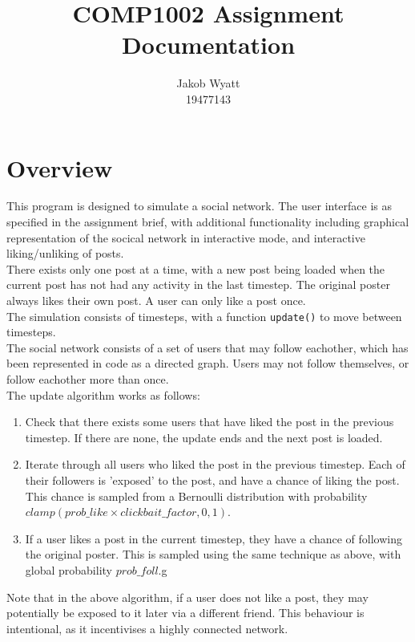 \documentclass{article}
\title{COMP1002 Assignment\\Documentation}
\author{Jakob Wyatt\\19477143}
\begin{document}
\maketitle
\pagebreak
\section{Overview}
\label{sec:Overview}
This program is designed to simulate a social network.
The user interface is as specified in the assignment brief,
with additional functionality including graphical representation
of the socical network in interactive mode, and interactive liking/unliking 
of posts.\\
There exists only one post at a time, with a new post being loaded when the current
post has not had any activity in the last timestep. The original poster always
likes their own post. A user can only like a post once.\\
The simulation consists
of timesteps, with a function \texttt{update()} to move between timesteps.\\
The social network consists of a set of users that may follow eachother,
which has been represented in code as a directed graph. Users may not follow themselves,
or follow eachother more than once.\\
The update algorithm works as follows:
\begin{enumerate}
    \item Check that there exists some users that have liked the post in the previous timestep.
            If there are none, the update ends and the next post is loaded.
    \item Iterate through all users who liked the post in the previous timestep.
            Each of their followers is 'exposed' to the post, and have a chance of liking the post.
            This chance is sampled from a Bernoulli distribution with probability
            $\mathit{clamp}(\mathit{prob\_like} \times \mathit{clickbait\_factor}, 0, 1)$.
    \item If a user likes a post in the current timestep, they have a chance of following the
            original poster. This is sampled using the same technique as above, with global probability
            $\mathit{prob\_foll}$.g
\end{enumerate}
Note that in the above algorithm, if a user does not like a post, they may potentially
be exposed to it later via a different friend. This behaviour is intentional, as it incentivises
a highly connected network.
\end{document}
